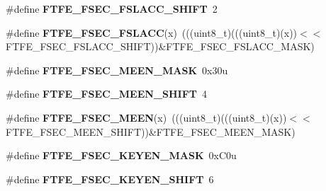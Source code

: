 \begin{DoxyCompactItemize}
\item 
\#define {\bfseries F\+T\+F\+E\+\_\+\+F\+S\+E\+C\+\_\+\+F\+S\+L\+A\+C\+C\+\_\+\+S\+H\+I\+FT}~2\hypertarget{group__FTFE__Register__Masks_ga7e242828689c59247ae5c4e78dbea147}{}\label{group__FTFE__Register__Masks_ga7e242828689c59247ae5c4e78dbea147}

\item 
\#define {\bfseries F\+T\+F\+E\+\_\+\+F\+S\+E\+C\+\_\+\+F\+S\+L\+A\+CC}(x)~(((uint8\+\_\+t)(((uint8\+\_\+t)(x))$<$$<$F\+T\+F\+E\+\_\+\+F\+S\+E\+C\+\_\+\+F\+S\+L\+A\+C\+C\+\_\+\+S\+H\+I\+FT))\&F\+T\+F\+E\+\_\+\+F\+S\+E\+C\+\_\+\+F\+S\+L\+A\+C\+C\+\_\+\+M\+A\+SK)\hypertarget{group__FTFE__Register__Masks_ga7fc033cf747e62c1e7f01a2bdd6777ab}{}\label{group__FTFE__Register__Masks_ga7fc033cf747e62c1e7f01a2bdd6777ab}

\item 
\#define {\bfseries F\+T\+F\+E\+\_\+\+F\+S\+E\+C\+\_\+\+M\+E\+E\+N\+\_\+\+M\+A\+SK}~0x30u\hypertarget{group__FTFE__Register__Masks_ga1eb5ff8901b0e60cc847e11e66096931}{}\label{group__FTFE__Register__Masks_ga1eb5ff8901b0e60cc847e11e66096931}

\item 
\#define {\bfseries F\+T\+F\+E\+\_\+\+F\+S\+E\+C\+\_\+\+M\+E\+E\+N\+\_\+\+S\+H\+I\+FT}~4\hypertarget{group__FTFE__Register__Masks_gabcb6c110f2c3a61788237eb32991610d}{}\label{group__FTFE__Register__Masks_gabcb6c110f2c3a61788237eb32991610d}

\item 
\#define {\bfseries F\+T\+F\+E\+\_\+\+F\+S\+E\+C\+\_\+\+M\+E\+EN}(x)~(((uint8\+\_\+t)(((uint8\+\_\+t)(x))$<$$<$F\+T\+F\+E\+\_\+\+F\+S\+E\+C\+\_\+\+M\+E\+E\+N\+\_\+\+S\+H\+I\+FT))\&F\+T\+F\+E\+\_\+\+F\+S\+E\+C\+\_\+\+M\+E\+E\+N\+\_\+\+M\+A\+SK)\hypertarget{group__FTFE__Register__Masks_ga108bfb67146722401793624ac45080fe}{}\label{group__FTFE__Register__Masks_ga108bfb67146722401793624ac45080fe}

\item 
\#define {\bfseries F\+T\+F\+E\+\_\+\+F\+S\+E\+C\+\_\+\+K\+E\+Y\+E\+N\+\_\+\+M\+A\+SK}~0x\+C0u\hypertarget{group__FTFE__Register__Masks_ga7417ca1039c57d3a275bef88e0cfe6f1}{}\label{group__FTFE__Register__Masks_ga7417ca1039c57d3a275bef88e0cfe6f1}

\item 
\#define {\bfseries F\+T\+F\+E\+\_\+\+F\+S\+E\+C\+\_\+\+K\+E\+Y\+E\+N\+\_\+\+S\+H\+I\+FT}~6\hypertarget{group__FTFE__Register__Masks_gacd8d966f0f526c11eec0590854c258be}{}\label{group__FTFE__Register__Masks_gacd8d966f0f526c11eec0590854c258be}


\end{DoxyCompactItemize}
